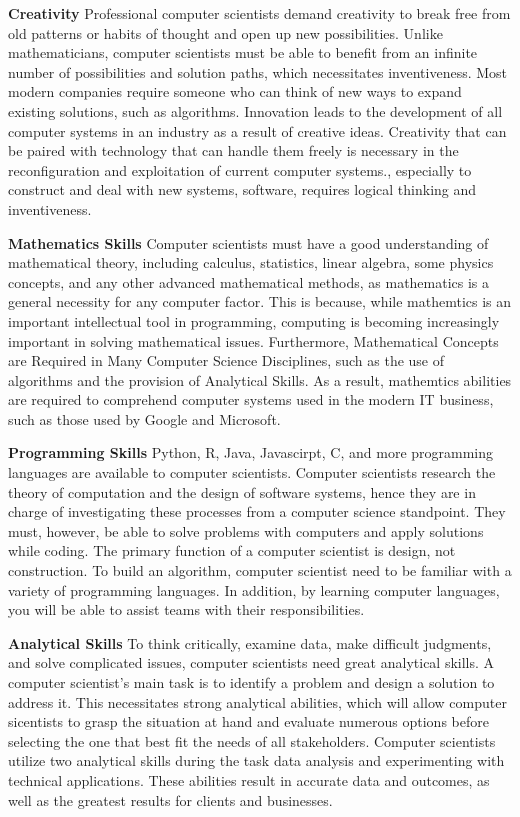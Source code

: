 \documentclass[a4paper, 11pt]{report}
\begin{document}
\textbf{Creativity}
  Professional computer scientists demand creativity to break free from old patterns or habits of thought and open up new possibilities. Unlike mathematicians, computer scientists must be able to benefit from an infinite number of possibilities and solution paths, which necessitates inventiveness. Most modern companies require someone who can think of new ways to expand existing solutions, such as algorithms. Innovation leads to the development of all computer systems in an industry as a result of creative ideas. Creativity that can be paired with technology that can handle them freely is necessary in the reconfiguration and exploitation of current computer systems., especially to construct and deal with new systems, software, requires logical thinking and inventiveness.

\textbf{Mathematics Skills}
  Computer scientists must have a good understanding of mathematical theory, including calculus, statistics, linear algebra, some physics concepts, and any other advanced mathematical methods, as mathematics is a general necessity for any computer factor. This is because, while mathemtics is an important intellectual tool in programming, computing is becoming increasingly important in solving mathematical issues. Furthermore, Mathematical Concepts are Required in Many Computer Science Disciplines, such as the use of algorithms and the provision of Analytical Skills. As a result, mathemtics abilities are required to comprehend computer systems used in the modern IT business, such as those used by Google and Microsoft.

\textbf{Programming Skills}
  Python, R, Java, Javascirpt, C, and more programming languages are available to computer scientists. Computer scientists research the theory of computation and the design of software systems, hence they are in charge of investigating these processes from a computer science standpoint. They must, however, be able to solve problems with computers and apply solutions while coding. The primary function of a computer scientist is design, not construction. To build an algorithm, computer scientist need to be familiar with a variety of programming languages. In addition, by learning computer languages, you will be able to assist teams with their responsibilities.

\textbf{Analytical Skills}
  To think critically, examine data, make difficult judgments, and solve complicated issues, computer scientists need great analytical skills. \cite{ident} A computer scientist's main task is to identify a problem and design a solution to address it. This necessitates strong analytical abilities, which will allow computer sicentists to grasp the situation at hand and evaluate numerous options before selecting the one that best fit the needs of all stakeholders. Computer scientists utilize two analytical skills during the task data analysis and experimenting with technical applications. These abilities result in accurate data and outcomes, as well as the greatest results for clients and businesses.
\end{document}
